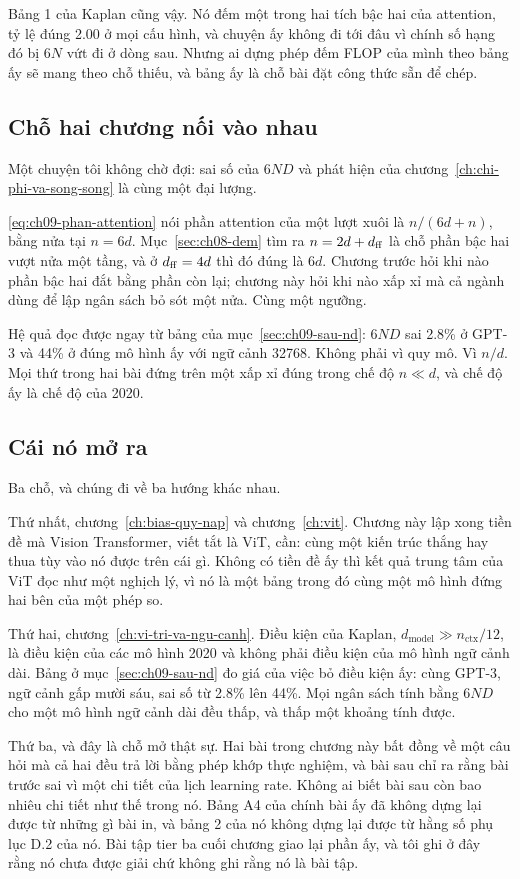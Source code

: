 Bảng 1 của Kaplan cũng vậy. Nó đếm một trong hai tích bậc hai của attention,
tỷ lệ đúng 2.00 ở mọi cấu hình, và chuyện ấy không đi tới đâu vì chính số hạng
đó bị \(6N\) vứt đi ở dòng sau. Nhưng ai dựng phép đếm FLOP của mình theo bảng
ấy sẽ mang theo chỗ thiếu, và bảng ấy là chỗ bài đặt công thức sẵn để chép.

\subsection*{Chỗ hai chương nối vào nhau}

%
Một chuyện tôi không chờ đợi: sai số của \(6ND\) và phát hiện của
chương~\ref{ch:chi-phi-va-song-song} là cùng một đại lượng.

\eqref{eq:ch09-phan-attention} nói phần attention của một lượt xuôi là
\(n/(6d+n)\), bằng nửa tại \(n = 6d\). Mục~\ref{sec:ch08-dem} tìm ra
\(n = 2d + d_{\mathrm{ff}}\) là chỗ phần bậc hai vượt nửa một tầng, và ở \(d_{\mathrm{ff}} = 4d\) thì
đó đúng là \(6d\). Chương trước hỏi khi nào phần bậc hai đắt bằng phần còn lại;
chương này hỏi khi nào xấp xỉ mà cả ngành dùng để lập ngân sách bỏ sót một nửa.
Cùng một ngưỡng.

Hệ quả đọc được ngay từ bảng của mục~\ref{sec:ch09-sau-nd}: \(6ND\) sai 2.8\%
ở GPT-3 và 44\% ở đúng mô hình ấy với ngữ cảnh 32768. Không phải vì quy mô. Vì
\(n/d\). Mọi thứ trong hai bài  đứng trên một
xấp xỉ đúng trong chế độ \(n \ll d\), và chế độ ấy là chế độ của 2020.

\subsection*{Cái nó mở ra}

%
Ba chỗ, và chúng đi về ba hướng khác nhau.

Thứ nhất, chương~\ref{ch:bias-quy-nap} và chương~\ref{ch:vit}. Chương này lập
xong tiền đề mà Vision Transformer, viết tắt là ViT, cần: cùng một kiến trúc
thắng hay thua tùy vào nó được  trên cái gì.
Không có tiền đề ấy thì kết quả trung tâm của ViT đọc
như một nghịch lý, vì nó là một bảng trong đó cùng một mô hình đứng hai bên của
một phép so.

Thứ hai, chương~\ref{ch:vi-tri-va-ngu-canh}. Điều kiện của Kaplan,
\(d_{\mathrm{model}} \gg n_{\mathrm{ctx}}/12\), là điều kiện của các mô hình
2020 và không phải điều kiện của mô hình ngữ cảnh dài. Bảng ở
mục~\ref{sec:ch09-sau-nd} đo giá của việc bỏ điều kiện ấy: cùng GPT-3, ngữ cảnh
gấp mười sáu, sai số từ 2.8\% lên 44\%. Mọi ngân sách tính bằng \(6ND\) cho một
mô hình ngữ cảnh dài đều thấp, và thấp một khoảng tính được.

Thứ ba, và đây là chỗ mở thật sự. Hai bài trong chương này bất đồng về một câu
hỏi mà cả hai đều trả lời bằng phép khớp thực nghiệm, và bài sau chỉ ra rằng
bài trước sai vì một chi tiết của lịch learning rate. Không ai biết bài sau còn
bao nhiêu chi tiết như thế trong nó. Bảng A4 của chính bài ấy đã không dựng lại
được từ những gì bài in, và bảng 2 của nó không dựng lại được từ hằng số phụ lục
D.2 của nó. Bài tập tier ba cuối chương giao lại phần ấy, và tôi ghi ở đây rằng
nó chưa được giải chứ không ghi rằng nó là bài tập.
